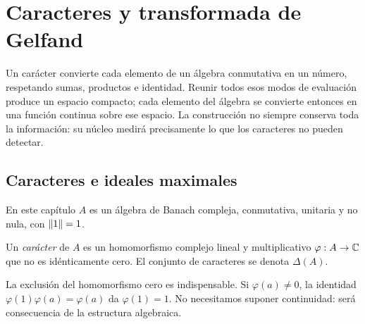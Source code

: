 \chapter{Caracteres y transformada de Gelfand}\label{cap:v3-12}

Un carácter convierte cada elemento de un álgebra conmutativa en un número, respetando sumas, productos e identidad. Reunir todos esos modos de evaluación produce un espacio compacto; cada elemento del álgebra se convierte entonces en una función continua sobre ese espacio. La construcción no siempre conserva toda la información: su núcleo medirá precisamente lo que los caracteres no pueden detectar.

\section{Caracteres e ideales maximales}\label{lec:v3-24}

En este capítulo $A$ es un álgebra de Banach compleja, conmutativa, unitaria y no nula, con $\left\lVert1\right\rVert=1$.

\begin{definicion}
Un \emph{carácter} de $A$ es un homomorfismo complejo lineal y multiplicativo $\varphi:A\to\mathbb C$ que no es idénticamente cero. El conjunto de caracteres se denota $\Delta(A)$.
\end{definicion}

La exclusión del homomorfismo cero es indispensable. Si $\varphi(a)\ne0$, la identidad $\varphi(1)\varphi(a)=\varphi(a)$ da $\varphi(1)=1$. No necesitamos suponer continuidad: será consecuencia de la estructura algebraica.

